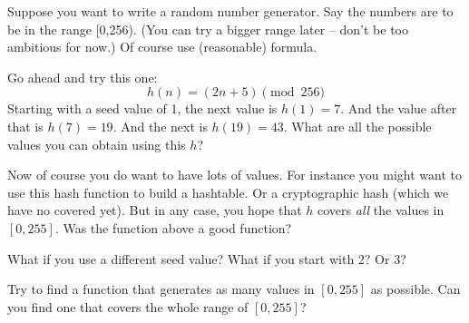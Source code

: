   Suppose you want to write a random number generator.
  Say the numbers are to be in the range [0,256).
  (You can try a bigger range later -- don't be too ambitious for now.)
  Of course use (reasonable) formula.
  \begin{myenum}
  \item Go ahead and try this one:
    \[
      h(n) = (2n + 5) \pmod{256} 
    \]
    Starting with a seed value of 1, the next value is $h(1) = 7$.
    And the value after that is $h(7) = 19$.
    And the next is $h(19) = 43$.
    What are all the possible values you can obtain using this $h$?
  \item
    Now of course you do want to have lots of values.
    For instance you might want to use this hash function
    to build a hashtable.
    Or a cryptographic hash (which we have no covered yet).
    But in any case, you hope that $h$ covers \textit{all} the values in
    $[0,255]$.
    Was the function above a good function?  
  \item
    What if you use a different seed value? What if you start with 2?
    Or 3?
  \item 
    Try to find a function that generates
    as many values in $[0,255]$ as possible.
    Can you find one that covers the whole range of $[0,255]$?
  \end{myenum}
